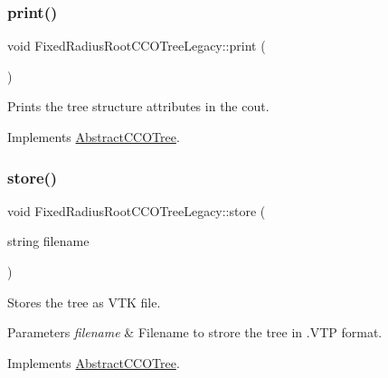 \subsubsection{\texorpdfstring{print()}{print()}}
{\footnotesize\ttfamily void Fixed\+Radius\+Root\+C\+C\+O\+Tree\+Legacy\+::print (\begin{DoxyParamCaption}{ }\end{DoxyParamCaption})\hspace{0.3cm}{\ttfamily [virtual]}}

Prints the tree structure attributes in the cout. 

Implements \mbox{\hyperlink{class_abstract_c_c_o_tree}{Abstract\+C\+C\+O\+Tree}}.

\mbox{\label{class_fixed_radius_root_c_c_o_tree_legacy_ae62b6fcd1aa0f3772aea173d036f8bb7}} 
\subsubsection{\texorpdfstring{store()}{store()}}
{\footnotesize\ttfamily void Fixed\+Radius\+Root\+C\+C\+O\+Tree\+Legacy\+::store (\begin{DoxyParamCaption}\item[{string}]{filename }\end{DoxyParamCaption})\hspace{0.3cm}{\ttfamily [virtual]}}

Stores the tree as V\+TK file. 
\begin{DoxyParams}{Parameters}
{\em filename} & Filename to strore the tree in .V\+TP format. \\
\hline
\end{DoxyParams}


Implements \mbox{\hyperlink{class_abstract_c_c_o_tree}{Abstract\+C\+C\+O\+Tree}}.

\mbox{\label{class_fixed_radius_root_c_c_o_tree_legacy_a1b36d4046bc3d3ac897eec5d1cec0308}} 

